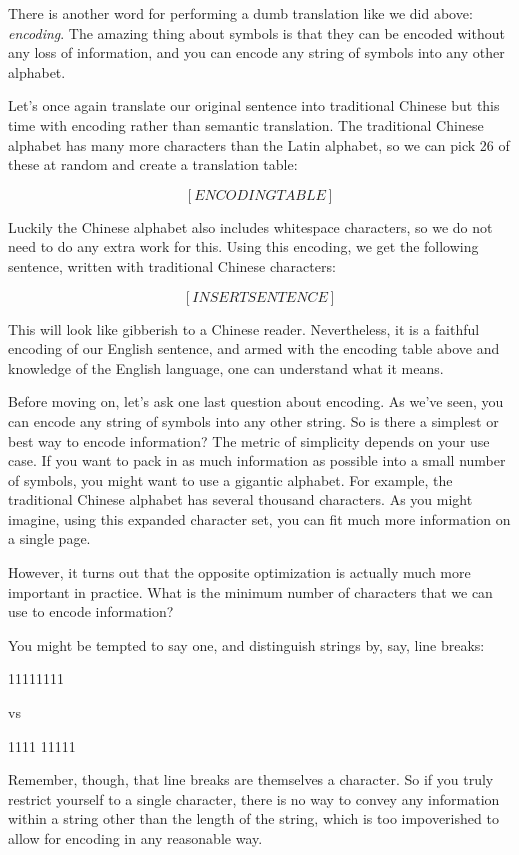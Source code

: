 \documentclass{book}
\begin{document}
There is another word for performing a dumb translation like we did above: \emph{encoding}. The amazing thing about symbols is that they can be encoded without any loss of information, and you can encode any string of symbols into any other alphabet.

Let's once again translate our original sentence into traditional Chinese but this time with encoding rather than semantic translation. The traditional Chinese alphabet has many more characters than the Latin alphabet, so we can pick 26 of these at random and create a translation table:

\[ [ENCODING TABLE] \]

Luckily the Chinese alphabet also includes whitespace characters, so we do not need to do any extra work for this. Using this encoding, we get the following sentence, written with traditional Chinese characters:

\[ [INSERT SENTENCE] \]

This will look like gibberish to a Chinese reader. Nevertheless, it is a faithful encoding of our English sentence, and armed with the encoding table above and knowledge of the English language, one can understand what it means.

Before moving on, let's ask one last question about encoding. As we've seen, you can encode any string of symbols into any other string. So is there a simplest or best way to encode information? The metric of simplicity depends on your use case. If you want to pack in as much information as possible into a small number of symbols, you might want to use a gigantic alphabet. For example, the traditional Chinese alphabet has several thousand characters. As you might imagine, using this expanded character set, you can fit much more information on a single page.

However, it turns out that the opposite optimization is actually much more important in practice. What is the minimum number of characters that we can use to encode information?

You might be tempted to say one, and distinguish strings by, say, line breaks:

11111111

vs

1111
11111

Remember, though, that line breaks are themselves a character. So if you truly restrict yourself to a single character, there is no way to convey any information within a string other than the length of the string, which is too impoverished to allow for encoding in any reasonable way.
\end{document}
